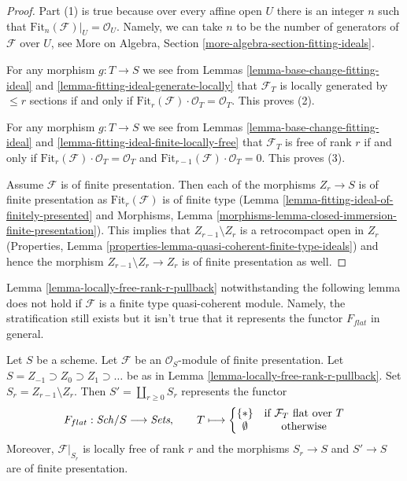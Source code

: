 \begin{proof}
Part (1) is true because over every affine open $U$ there is an integer $n$
such that $\text{Fit}_n(\mathcal{F})|_U = \mathcal{O}_U$. Namely, we can
take $n$ to be the number of generators of $\mathcal{F}$ over $U$, see
More on Algebra, Section \ref{more-algebra-section-fitting-ideals}.

\medskip\noindent
For any morphism $g : T \to S$ we see from
Lemmas \ref{lemma-base-change-fitting-ideal} and
\ref{lemma-fitting-ideal-generate-locally}
that $\mathcal{F}_T$ is locally generated by $\leq r$ sections if and only if
$\text{Fit}_r(\mathcal{F}) \cdot \mathcal{O}_T = \mathcal{O}_T$.
This proves (2).

\medskip\noindent
For any morphism $g : T \to S$ we see from
Lemmas \ref{lemma-base-change-fitting-ideal} and
\ref{lemma-fitting-ideal-finite-locally-free}
that $\mathcal{F}_T$ is free of rank $r$ if and only if
$\text{Fit}_r(\mathcal{F}) \cdot \mathcal{O}_T = \mathcal{O}_T$ and
$\text{Fit}_{r - 1}(\mathcal{F}) \cdot \mathcal{O}_T = 0$.
This proves (3).

\medskip\noindent
Assume $\mathcal{F}$ is of finite presentation. Then each of the morphisms
$Z_r \to S$ is of finite presentation as $\text{Fit}_r(\mathcal{F})$
is of finite type (Lemma \ref{lemma-fitting-ideal-of-finitely-presented} and
Morphisms, Lemma \ref{morphisms-lemma-closed-immersion-finite-presentation}).
This implies that $Z_{r - 1} \setminus Z_r$ is a retrocompact open in $Z_r$
(Properties, Lemma \ref{properties-lemma-quasi-coherent-finite-type-ideals})
and hence the morphism $Z_{r - 1} \setminus Z_r \to Z_r$
is of finite presentation as well.
\end{proof}

\noindent
Lemma \ref{lemma-locally-free-rank-r-pullback} notwithstanding
the following lemma does not hold if $\mathcal{F}$ is a finite type
quasi-coherent module. Namely, the stratification still exists but
it isn't true that it represents the functor $F_{flat}$ in general.

\begin{lemma}
\label{lemma-finite-presentation-module}
Let $S$ be a scheme. Let $\mathcal{F}$ be an $\mathcal{O}_S$-module
of finite presentation. Let $S = Z_{-1} \supset Z_0 \supset Z_1 \supset \ldots$
be as in Lemma \ref{lemma-locally-free-rank-r-pullback}.
Set $S_r = Z_{r - 1} \setminus Z_r$.
Then $S' = \coprod_{r \geq 0} S_r$ represents the functor
$$
F_{flat} : \mathit{Sch}/S \longrightarrow \textit{Sets},\quad\quad
T \longmapsto
\left\{
\begin{matrix}
\{*\} & \text{if }\mathcal{F}_T\text{ flat over }T\\
\emptyset & \text{otherwise}
\end{matrix}
\right.
$$
Moreover, $\mathcal{F}|_{S_r}$ is locally free of rank $r$ and the
morphisms $S_r \to S$ and $S' \to S$ are of finite presentation.
\end{lemma}

